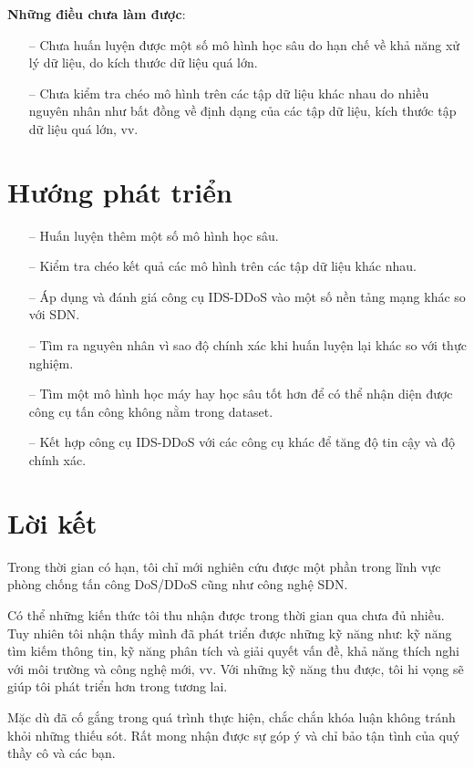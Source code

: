 \textbf{Những điều chưa làm được}:

\begin{itemize}
	\item [--] Chưa huấn luyện được một số mô hình học sâu do hạn chế về khả năng xử lý dữ liệu, do kích thước dữ liệu quá lớn.
	\item [--] Chưa kiểm tra chéo mô hình trên các tập dữ liệu khác nhau do nhiều nguyên nhân như bất đồng về định dạng của các tập dữ liệu, kích thước tập dữ liệu quá lớn, vv.
\end{itemize}

\section{Hướng phát triển}

\begin{itemize}
	\item [--] Huấn luyện thêm một số mô hình học sâu.
	\item [--] Kiểm tra chéo kết quả các mô hình trên các tập dữ liệu khác nhau.
	\item [--] Áp dụng và đánh giá công cụ IDS-DDoS vào một số nền tảng mạng khác so với SDN.
	\item [--] Tìm ra nguyên nhân vì sao độ chính xác khi huấn luyện lại khác so với thực nghiệm.
	\item [--] Tìm một mô hình học máy hay học sâu tốt hơn để có thể nhận diện được công cụ tấn công không nằm trong  dataset.
	\item [--]  Kết hợp công cụ IDS-DDoS với các công cụ khác để tăng độ tin cậy và độ chính xác.
\end{itemize}

\section{Lời kết}

Trong thời gian có hạn, tôi chỉ mới nghiên cứu được một phần trong lĩnh vực phòng chống tấn công DoS/DDoS cũng như công nghệ SDN.

Có thể những kiến thức tôi thu nhận được trong thời gian qua chưa đủ nhiều. Tuy nhiên tôi nhận thấy mình đã phát triển được những kỹ năng như: kỹ năng tìm kiếm thông tin, kỹ năng phân tích và giải quyết vấn đề, khả năng thích nghi với môi trường và công nghệ mới, vv. Với những kỹ năng thu được, tôi hi vọng sẽ giúp tôi phát triển hơn trong tương lai.

Mặc dù đã cố gắng trong quá trình thực hiện, chắc chắn khóa luận không tránh
khỏi những thiếu sót. Rất mong nhận được sự góp ý và chỉ bảo tận tình của quý thầy
cô và các bạn.